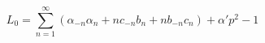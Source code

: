 \begin{equation}
L_0 = \sum_{n = 1}^{ \infty} 
\left( \alpha_{-n} \alpha_n + nc_{-n} b_n + nb_{-n} c_n \right) +
\alpha' p^2 -1
\end{equation}

